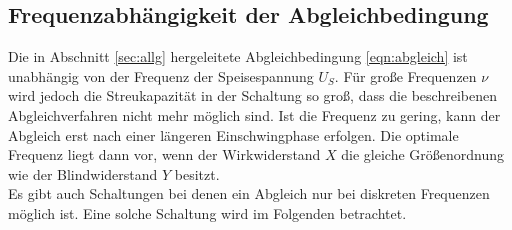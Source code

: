 \subsection{Frequenzabhängigkeit der Abgleichbedingung}
\label{sec:frequenzabhängig}
Die in Abschnitt \ref{sec:allg} hergeleitete Abgleichbedingung \eqref{eqn:abgleich} ist unabhängig von der Frequenz der Speisespannung $U_S$.
Für große Frequenzen $\nu$ wird jedoch die Streukapazität in der Schaltung so groß, dass die beschreibenen Abgleichverfahren nicht mehr 
möglich sind. Ist die Frequenz zu gering, kann der Abgleich erst nach einer längeren Einschwingphase erfolgen. Die optimale Frequenz liegt 
dann vor, wenn der Wirkwiderstand $X$ die gleiche Größenordnung wie der Blindwiderstand $Y$ besitzt.
\\\noindent 
Es gibt auch Schaltungen bei denen ein Abgleich nur bei diskreten Frequenzen möglich ist. Eine solche Schaltung wird im Folgenden
betrachtet.  

